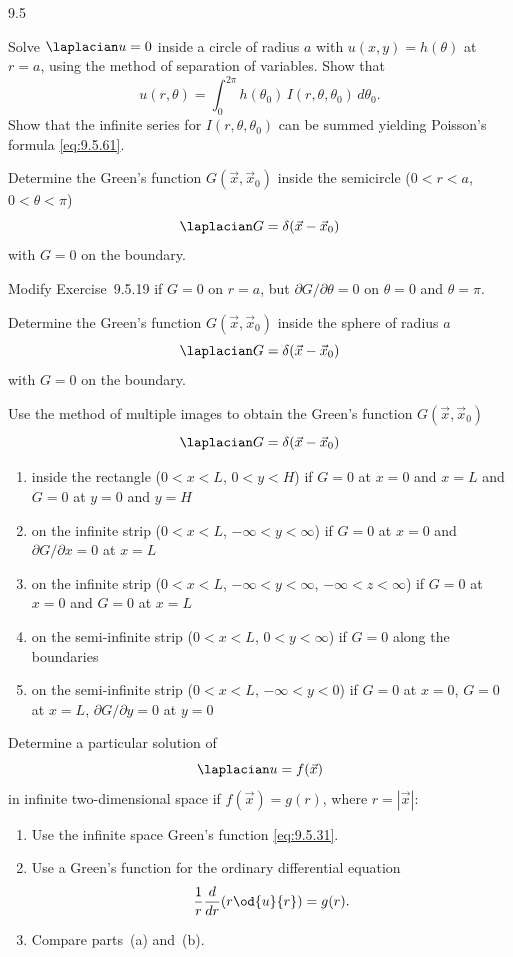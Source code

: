 \begin{exercises}{9.5}
\item Solve $\laplacian u = 0$ inside a circle of radius $a$ with $u(x,y) = h(\theta)$ at $r = a$, using the method of separation of variables.  Show that
\[
u(r,\theta) = \int_0^{2\pi} h(\theta_0)\,I(r,\theta,\theta_0)\,d\theta_0.
\]
Show that the infinite series for $I(r,\theta,\theta_0)$ can be summed yielding Poisson's formula \eqref{eq:9.5.61}.

\item[\starred 9.5.19.] Determine the Green's function $G(\vec{x},\vec{x}_0)$ inside the semicircle ($0 < r < a$, $0 < \theta < \pi$)
\[
\laplacian G = \delta(\vec{x}-\vec{x}_0)
\]
with $G = 0$ on the boundary.

\item Modify Exercise~9.5.19 if $G = 0$ on $r = a$, but $\partial G/\partial\theta = 0$ on $\theta = 0$ and $\theta = \pi$.

\item Determine the Green's function $G(\vec{x},\vec{x}_0)$ inside the sphere of radius $a$
\[
\laplacian G = \delta(\vec{x}-\vec{x}_0)
\]
with $G = 0$ on the boundary.

\item Use the method of multiple images to obtain the Green's function $G(\vec{x},\vec{x}_0)$
\[
\laplacian G = \delta(\vec{x}-\vec{x}_0)
\]
\begin{enumerate}
\item[(a)] inside the rectangle ($0 < x < L$, $0 < y < H$) if $G = 0$ at $x = 0$ and $x = L$ and $G = 0$ at $y = 0$ and $y = H$
\item[(b)] on the infinite strip ($0 < x < L$, $-\infty < y < \infty$) if $G = 0$ at $x = 0$ and $\partial G/\partial x = 0$ at $x = L$
\item[\starred(c)] on the infinite strip ($0 < x < L$, $-\infty < y < \infty$, $-\infty < z < \infty$) if $G = 0$ at $x = 0$ and $G = 0$ at $x = L$
\item[(d)] on the semi-infinite strip ($0 < x < L$, $0 < y < \infty$) if $G = 0$ along the boundaries
\item[(e)] on the semi-infinite strip ($0 < x < L$, $-\infty < y < 0$) if $G = 0$ at $x = 0$, $G = 0$ at $x = L$, $\partial G/\partial y = 0$ at $y = 0$
\end{enumerate}

\item Determine a particular solution of
\[
\laplacian u = f(\vec{x})
\]
in infinite two-dimensional space if $f(\vec{x}) = g(r)$, where $r = |\vec{x}|$:
\begin{enumerate}
\item[(a)] Use the infinite space Green's function \eqref{eq:9.5.31}.
\item[(b)] Use a Green's function for the ordinary differential equation
\[
\frac{1}{r}\frac{d}{d r}\!\left(r\od{u}{r}\right) = g(r).
\]
\item[(c)] Compare parts~(a) and~(b).
\end{enumerate}


\end{exercises}
